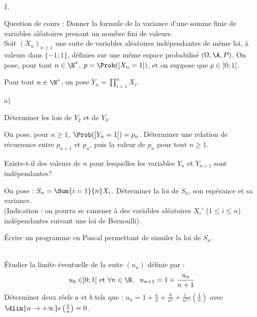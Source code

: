 \documentclass[11pt]{article}%
\begin{document}
\begin{exerciceAP}~
  \begin{noliste}{1.}
    \setlength{\itemsep}{2mm}
  \item Question de cours : Donner la formule de la variance d'une
    somme finie de variables aléatoires prenant un nombre fini de
    valeurs.
    \\[.2cm]
    Soit $(X_n)_{n \geq 1}$ une suite de variables aléatoires
    indépendantes de même loi, à valeurs dans $\{-1 ; 1\}$, définies
    sur une même espace probabilisé $(\Omega , \A , P)$. On pose, pour
    tout $n \in \N^*$, $p = \Prob([X_n = 1])$, et on suppose que $p
    \in ] 0 ; 1[$.
  \item Pour tout $n \in \N^*$, on pose $Y_n = \prod\limits_{i=1}^n X_i$.
    \begin{noliste}{a)}
    \setlength{\itemsep}{2mm}
    \item Déterminer les lois de $Y_2$ et de $Y_3$.
    \item On pose, pour $n \geq 1$, $\Prob([Y_n = 1]) =
      p_n$. Déterminer une relation de récurrence entre $p_{n+1}$ et
      $p_n$, puis la valeur de $p_n$ pour tout $n \geq 1$.
    \item Existe-t-il des valeurs de $n$ pour lesquelles les variables
      $Y_n$ et $Y_{n+1}$ sont indépendantes?
    \end{noliste}
  \item On pose : $S_n = \Sum{i=1}{n} X_i$. Déterminer la loi de
    $S_n$, son espérance et sa variance. \\
    (Indication : on pourra se ramener à des variables aléatoires
    $X_i'$ ($1 \leq i \leq n$) indépendantes suivant une loi de
    Bernoulli).
  \item Écrire un programme en Pascal permettant de simuler la loi de $S_n$. \\
  \end{noliste}
\end{exerciceAP}


\begin{exerciceSP}~\\
  Étudier la limite éventuelle de la suite $(u_n)$ définie par :
  \[
  u_0 \in ] 0 ; 1[ \text{ et } \forall n \in \N,\ \ u_{n+1} = 1 +
  \frac{u_n}{n+1}
 \]
 Déterminer deux réels $a$ et $b$ tels que : $u_n = 1 + \frac{a}{n} +
 \frac{b}{n^2} + \frac{1}{n^2} \epsilon \left( \frac{1}{n} \right)$
 avec $\dlim{n \rightarrow +\infty} \epsilon \left( \frac{1}{n}
 \right) = 0$.
\end{exerciceSP}
\end{document}
